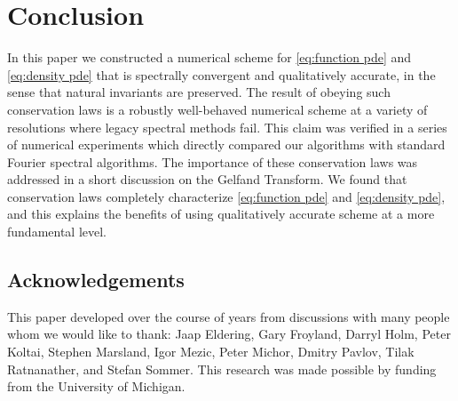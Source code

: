 \documentclass[final,leqno]{siamltex1213}
\begin{document}
\section{Conclusion}

In this paper we constructed a numerical scheme for \eqref{eq:function pde} and \eqref{eq:density pde} that is spectrally convergent and qualitatively accurate, in the sense that natural invariants are preserved.
The result of obeying such conservation laws is a robustly well-behaved numerical scheme at a variety of resolutions where legacy spectral methods fail.
This claim was verified in a series of numerical experiments which directly compared our algorithms with standard Fourier spectral algorithms.
The importance of these conservation laws was addressed in a short discussion on the Gelfand Transform.
We found that conservation laws completely characterize \eqref{eq:function pde} and \eqref{eq:density pde}, and this explains the benefits of using qualitatively accurate scheme at a more fundamental level.


\subsection{Acknowledgements}
This paper developed over the course of years from discussions with many people whom we would like to thank: Jaap Eldering, Gary Froyland,
 	Darryl Holm, Peter Koltai, Stephen Marsland, Igor Mezic, Peter Michor, Dmitry Pavlov, Tilak Ratnanather, and Stefan Sommer. 
This research was made possible by funding from the University of Michigan.
\end{document}

